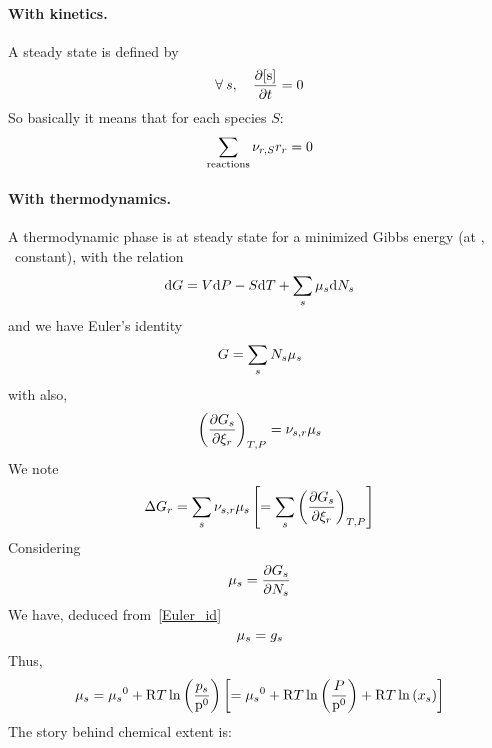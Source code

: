 \paragraph{With kinetics.}
A steady state is defined by
%
\begin{equation}
\forall\:s,\quad \doverdt{\conc[s]} = 0
\label{equilibrium:def}
\end{equation}
%
So basically it means that for each species $S$:
\begin{equation}
\sum_{\text{reactions}}\scoef[r,S] \rate[r] = 0
\end{equation}
%

\paragraph{With thermodynamics.}
A thermodynamic phase is at steady state
for a minimized Gibbs energy (at \Temp, \Press\ constant), with
the relation
\begin{equation}
\dd\Gibbs = \Vol\dd\Press - \Entr\dd\Temp + \sum_s\chempot[s]\dd\Mol[s]
\end{equation}
and we have Euler's identity
\begin{equation}
\Gibbs = \sum_s \Mol[s]\chempot[s]
\label{Euler_id}
\end{equation}
with also,
\begin{equation}
\left(\doverdext[r]{\Gibbs[s]}\right)_{\Temp,\Press} = \scoef[s,r]\chempot[s]
\end{equation}
We note
\begin{equation}
\DGibbs_r = \sum_s \scoef[s,r]\chempot[s] \left[= \sum_s \left(\doverdext[r]{\Gibbs[s]}\right)_{\Temp,\Press}\right]
\end{equation}
Considering
\begin{equation}
\chempot_s = \doverdn[s]{\Gibbs[s]}
\end{equation}
We have, deduced from~\ref{Euler_id}
\begin{equation}
\chempot[s] = \gibbs[s]
\end{equation}
Thus,
\begin{equation}
\chempot[s] = \chempotZ[s] + \Rg\Temp\ln\left(\frac{\press[s]}{\pz}\right)
     \left[ = \chempotZ[s] + \Rg\Temp\ln\left(\frac{\Press}{\pz}\right) + \Rg\Temp\ln\left(\molarfrac[s]\right) \right]
\end{equation}
The story behind chemical extent is:
